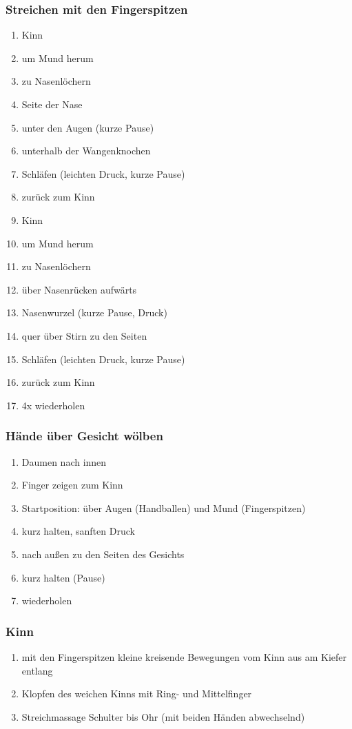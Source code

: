 \subsubsection{Streichen mit den Fingerspitzen}
\begin{enumerate}
\item Kinn
\item um Mund herum
\item zu Nasenlöchern
\item Seite der Nase
\item unter den Augen (kurze Pause)
\item unterhalb der Wangenknochen
\item Schläfen (leichten Druck, kurze Pause)
\item zurück zum Kinn
\item Kinn 
\item um Mund herum 
\item zu Nasenlöchern
\item über Nasenrücken aufwärts
\item Nasenwurzel (kurze Pause, Druck)
\item quer über Stirn zu den Seiten
\item Schläfen (leichten Druck, kurze Pause)
\item zurück zum Kinn
\item 4x wiederholen
\end{enumerate}

\subsubsection{Hände über Gesicht wölben}
\begin{enumerate}
\item Daumen nach innen
\item Finger zeigen zum Kinn
\item Startposition: über Augen (Handballen) und Mund (Fingerspitzen)
\item kurz halten, sanften Druck
\item nach außen zu den Seiten des Gesichts
\item kurz halten (Pause)
\item wiederholen
\end{enumerate}

\subsubsection{Kinn}
\begin{enumerate}
\item mit den Fingerspitzen kleine kreisende Bewegungen vom Kinn aus am Kiefer entlang
\item Klopfen des weichen Kinns mit Ring- und Mittelfinger
\item Streichmassage Schulter bis Ohr (mit beiden Händen abwechselnd)
\end{enumerate}

